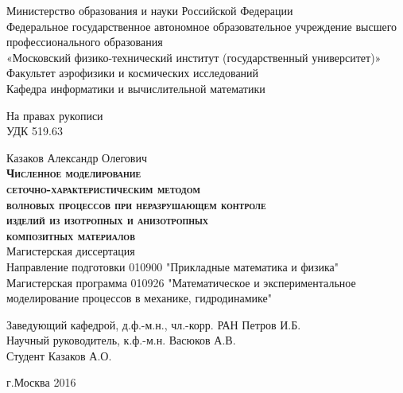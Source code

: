 \begin{titlepage}
\newpage

\begin{center}
	\small{Министерство образования и науки Российской Федерации} \\
	\small{Федеральное государственное автономное образовательное учреждение высшего профессионального образования} \\
	«Московский физико-технический институт (государственный университет)»\\
	Факультет аэрофизики и космических исследований\\
	Кафедра информатики и вычислительной математики\\
\end{center}

\vspace{1em}

\hfill На правах рукописи\\
\hfill УДК 519.63

\begin{center}
	Казаков Александр Олегович\\
	\textsc{\textbf{Численное моделирование\\
	 сеточно-характеристическим методом\\
	 волновых процессов при неразрушающем контроле\\
	 изделий из изотропных и анизотропных\\
	 композитных материалов}}\\[2cm]
	 Магистерская диссертация \\
	 Направление подготовки 010900 "Прикладные математика и физика" \\
	 Магистерская программа 010926 "Математическое и экспериментальное моделирование процессов в механике, гидродинамике" \\
\end{center}

\vspace{1.5em}


Заведующий кафедрой, д.ф.-м.н., чл.-корр. РАН Петров И.Б. \\
Научный руководитель, к.ф.-м.н. Васюков А.В. \\
Студент Казаков А.О. \\


\vfill

\begin{center}
	г.Москва
	2016
\end{center}


\end{titlepage}
